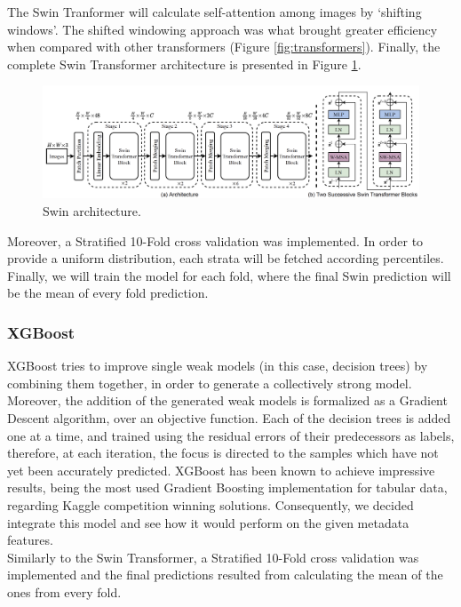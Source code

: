 \documentclass{article}
\begin{document}
The Swin Tranformer will calculate self-attention among images by ‘shifting windows’. The shifted windowing approach was what brought greater efficiency when compared with other transformers (Figure \ref{fig:transformers}). Finally, the complete Swin Transformer architecture is presented in Figure \ref{fig:swin}.

\vspace{1cm}

\begin{figure}[h!]
    \centering
    \includegraphics[width=1\linewidth]{figs/swin.png}
    \caption{Swin architecture.}
    \label{fig:swin}
\end{figure}

Moreover, a Stratified 10-Fold cross validation was implemented. In order to provide a uniform distribution, each strata will be fetched according percentiles. Finally, we will train the model for each fold, where the final Swin prediction will be the mean of every fold prediction. 


\subsubsection{XGBoost} \label{sec:xgb}
XGBoost tries to improve single weak models (in this case, decision trees) by combining them together, in order to generate a collectively strong model. Moreover, the addition of the generated weak models is formalized as a Gradient Descent algorithm, over an objective function. Each of the decision trees is added one at a time, and trained using the residual errors of their predecessors as labels, therefore, at each iteration, the focus is directed to the samples which have not yet been accurately predicted. XGBoost has been known to achieve impressive results, being the most used Gradient Boosting implementation for tabular data, regarding Kaggle competition winning solutions. Consequently, we decided integrate this model and see how it would perform on the given metadata features.\\
Similarly to the Swin Transformer, a Stratified 10-Fold cross validation was implemented and the final predictions resulted from calculating the mean of the ones from every fold.
\end{document}
